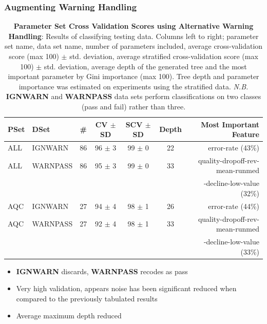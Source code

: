 \documentclass{beamer}
\begin{document}
\begin{frame}[t]
\frametitle{Augmenting Warning Handling}
    \begin{table}
        \centering
        \tiny
        \begin{tabular}{l l | c  c  c  c  r}
            PSet & DSet          & \# & CV $±$ SD & SCV $±$ SD & Depth & Most Important Feature\\
            \hline
            ALL & IGNWARN    & 86 & 96 $±$ 3 & 99 $±$ 0 & 22 & error-rate (43\%)\\
            ALL & WARNPASS   & 86 & 95 $±$ 3 & 99 $±$ 0 & 33 & quality-dropoff-rev-mean-runmed\\
                                                        &&&&&&-decline-low-value (32\%)\\
            AQC & IGNWARN    & 27 & 94 $±$ 4 & 98 $±$ 1 & 26 & error-rate (44\%)\\
            AQC & WARNPASS   & 27 & 92 $±$ 4 & 98 $±$ 1 & 33 & quality-dropoff-rev-mean-runmed\\
                                                        &&&&&&-decline-low-value (33\%)\\
        \end{tabular}

        \caption[all-pset-cv]{\tiny{\textbf{Parameter Set Cross Validation Scores using
            Alternative Warning Handling}:
            Results of classifying testing data.
            Columns left to right; parameter set name, data set name, number of parameters
            included, average cross-validation score (max 100) $±$ std. deviation,
            average stratified cross-validation score (max 100) $±$ std. deviation,
            average depth of the generated tree and the most important parameter by
            Gini importance (max 100). Tree depth and parameter importance was
            estimated on experiments using the stratified data. \textit{N.B.}
            \textbf{IGNWARN} and \textbf{WARNPASS} data sets perform classifications on
    two classes (pass and fail) rather than three.}}
    \end{table}
    \begin{itemize}
        \item \textbf{IGNWARN} discards, \textbf{WARNPASS} recodes as pass
        \item Very high validation, appears noise has been significant reduced
            when compared to the previously tabulated results
        \item Average maximum depth reduced
    \end{itemize}
\end{frame}
\end{document}
